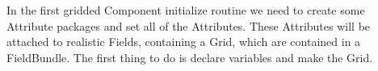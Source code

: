  
\setlength{\oldparskip}{\parskip}
\setlength{\parskip}{1.5ex}
\setlength{\oldparindent}{\parindent}
\setlength{\parindent}{0pt}
\setlength{\oldbaselineskip}{\baselineskip}
\setlength{\baselineskip}{11pt}
 
\def\bv{\begin{verbatim}}
\def\ev{\end{verbatim}}
\def\be{\begin{equation}}
\def\ee{\end{equation}}
\def\bea{\begin{eqnarray}}
\def\eea{\end{eqnarray}}
\def\bi{\begin{itemize}}
\def\ei{\end{itemize}}
\def\bn{\begin{enumerate}}
\def\en{\end{enumerate}}
\def\bd{\begin{description}}
\def\ed{\end{description}}
\def\({\left (}
\def\){\right )}
\def\[{\left [}
\def\]{\right ]}
\def\<{\left  \langle}
\def\>{\right \rangle}
\def\cI{{\cal I}}
\def\diag{\mathop{\rm diag}}
\def\tr{\mathop{\rm tr}}


 

   In the first gridded Component initialize routine we need to create some
   Attribute packages and set all of the Attributes.  These Attributes will
   be attached to realistic Fields, containing a Grid, which are contained in a
   FieldBundle.  The first thing to do is declare variables and make the Grid. 


